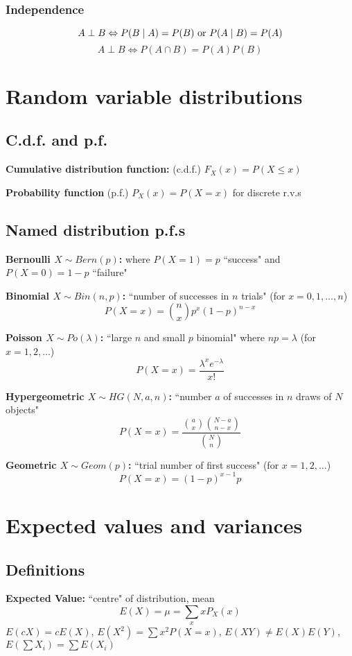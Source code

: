 \documentclass[15pt]{article}
\begin{document}
\subsubsection{Independence}
\[
    A \perp B \Leftrightarrow P(B \; | \; A) = P(B) \textnormal{ or } P(A \; | \; B) = P(A)
\]
\[
    A \perp B \Leftrightarrow P(A \cap B) = P(A) P(B)
\]

\section{Random variable distributions}
\subsection{C.d.f. and p.f.}
\textbf{Cumulative distribution function:} (c.d.f.) $F_X (x) = P(X \leq x)$

\textbf{Probability function} (p.f.) $P_X (x) = P(X = x)$ for discrete r.v.s

\subsection{Named distribution p.f.s}
\textbf{Bernoulli $X \sim Bern(p)$:} where $P(X = 1) = p$ ``success" and $P(X = 0) = 1 - p$ ``failure"

\textbf{Binomial $X \sim Bin(n,p)$:} ``number of successes in $n$ trials" (for $x = 0, 1, \dots, n$)
\[
    P(X = x) = \binom{n}{x} p^x (1-p)^{n-x}
\]

\textbf{Poisson $X \sim Po(\lambda)$:} ``large $n$ and small $p$ binomial" where $np = \lambda$ (for $x = 1, 2, \dots$)
\[
    P(X = x) = \frac{\lambda^x e^{-\lambda}}{x!}
\]

\textbf{Hypergeometric $X \sim HG(N,a,n)$:} ``number $a$ of successes in $n$ draws of $N$ objects"
\[
    P(X = x) = \frac{\binom{a}{x} \binom{N-a}{n-x}}{\binom{N}{n}}
\]

\textbf{Geometric $X \sim Geom(p)$:} ``trial number of first success" (for $x = 1, 2, \dots$)
\[
    P(X = x) = (1-p)^{x-1} p
\]

\section{Expected values and variances}
\subsection{Definitions}
\textbf{Expected Value:} ``centre" of distribution, mean
\[
    E(X) = \mu = \sum_{x} x P_X (x)
\]
$E(cX) = cE(X)$, $E(X^2) = \sum x^2 P(X = x)$, $E(XY) \neq E(X)E(Y)$, $E(\sum X_i) = \sum E(X_i)$
\end{document}
